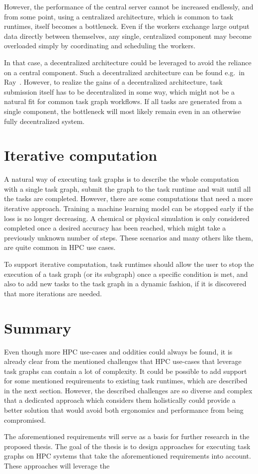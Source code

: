 \begin{description}
		However, the performance of the central server cannot be increased endlessly, and from some point,
		using a centralized architecture, which is common to task runtimes, itself becomes a bottleneck.
		Even if the workers exchange large output data directly between themselves, any single, centralized
		component may become overloaded simply by coordinating and scheduling the workers.

		In that case, a decentralized architecture could be leveraged to avoid the reliance on a central
		component. Such a decentralized architecture can be found e.g.\ in Ray~\cite{ray}.
		However, to realize the gains of a decentralized architecture, task submission itself has to be
		decentralized in some way, which might not be a natural fit for common task graph workflows. If all
		tasks are generated from a single component, the bottleneck will most likely remain even in an
		otherwise fully decentralized system.
\end{description}

\section{Iterative computation}
A natural way of executing task graphs is to describe the whole computation with a single task
graph, submit the graph to the task runtime and wait until all the tasks are completed. However,
there are some computations that need a more iterative approach. Training a machine learning model
can be stopped early if the loss is no longer decreasing. A chemical or physical simulation is only
considered completed once a desired accuracy has been reached, which might take a previously
unknown number of steps. These scenarios and many others like them, are quite common in HPC use
cases.

To support iterative computation, task runtimes should allow the user to stop the execution of a
task graph (or its subgraph) once a specific condition is met, and also to add new tasks to the
task graph in a dynamic fashion, if it is discovered that more iterations are needed.

\section{Summary}
Even though more HPC use-cases and oddities could always be found, it is already clear from the
mentioned challenges that HPC use-cases that leverage task graphs can contain a lot of complexity.
It could be possible to add support for some mentioned requirements to existing task runtimes,
which are described in the next section. However, the described challenges are so diverse and
complex that a dedicated approach which considers them holistically could provide a better solution
that would avoid both ergonomics and performance from being compromised.

The aforementioned requirements will serve as a basis for further research in the proposed thesis.
The goal of the thesis is to design approaches for executing task graphs on HPC systems that take
the aforementioned requirements into account. These approaches will leverage the
